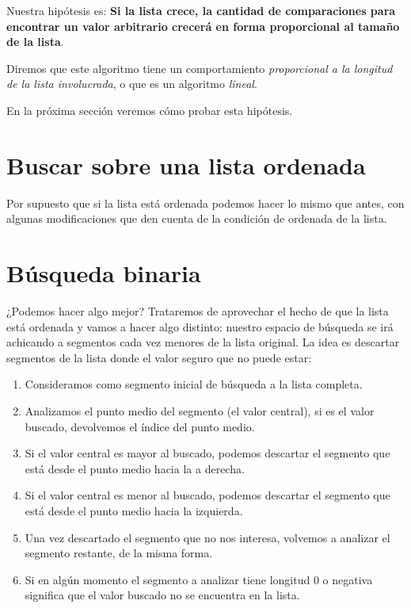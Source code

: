 Nuestra hipótesis es: {\bf Si la lista crece, la cantidad de comparaciones
para encontrar un valor arbitrario crecerá en forma proporcional al tamaño de
la lista}.

Diremos que este algoritmo tiene un comportamiento \emph{proporcional a la
longitud de la lista involucrada}, o que es un algoritmo \emph{lineal}.

En la próxima sección veremos cómo probar esta hipótesis.

\section{Buscar sobre una lista ordenada}

Por supuesto que si la lista está ordenada podemos hacer lo mismo que antes,
con algunas modificaciones que den cuenta de la condición de ordenada de la
lista.


\section{Búsqueda binaria}

¿Podemos hacer algo mejor? Trataremos de aprovechar el hecho de que la lista
está ordenada y vamos a hacer algo distinto: nuestro espacio de búsqueda se
irá achicando a segmentos cada vez menores de la lista original.
La idea es descartar segmentos de la lista donde el valor seguro que no puede
estar:

\begin{enumerate}
\item Consideramos como segmento inicial de búsqueda a la lista completa.

\item Analizamos el punto medio del segmento (el valor central), si es el valor
buscado, devolvemos el índice del punto medio.

\item Si el valor central es mayor al buscado, podemos descartar el segmento
que está desde el punto medio hacia la a derecha.

\item Si el valor central es menor al buscado, podemos descartar el segmento
que está desde el punto medio hacia la izquierda.

\item Una vez descartado el segmento que no nos interesa, volvemos a analizar
el segmento restante, de la misma forma.

\item Si en algún momento el segmento a analizar tiene longitud 0 o negativa
significa que el valor buscado no se encuentra en la lista.
\end{enumerate}

